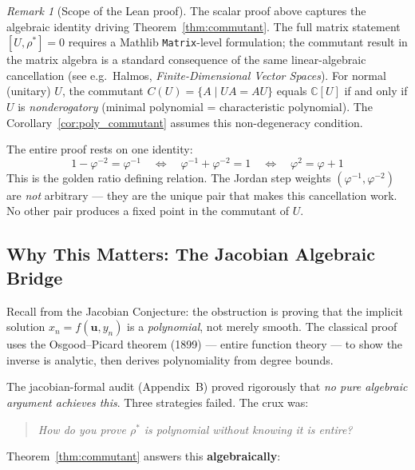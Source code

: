 \documentclass[12pt, letterpaper]{article}
\theoremstyle{plain}
\theoremstyle{definition}
\theoremstyle{remark}
\newtheorem{remark}[theorem]{Remark}
\begin{document}
\begin{remark}[Scope of the Lean proof]
The scalar proof above captures the algebraic identity driving Theorem~\ref{thm:commutant}.
The full matrix statement $[U, \rho^*] = 0$ requires a Mathlib \texttt{Matrix}-level
formulation; the commutant result in the matrix algebra is a standard consequence
of the same linear-algebraic cancellation (see e.g.\ Halmos, \textit{Finite-Dimensional Vector Spaces}).
For normal (unitary) $U$, the commutant $C(U) = \{A \mid UA = AU\}$ equals $\mathbb{C}[U]$
if and only if $U$ is \textit{nonderogatory} (minimal polynomial = characteristic polynomial).
The Corollary~\ref{cor:poly_commutant} assumes this non-degeneracy condition.
\end{remark}

\begin{noveltybox}[title={The Key Identity: $1 - \varphi^{-2} = \varphi^{-1}$}]
The entire proof rests on one identity:
\[
  1 - \varphi^{-2} = \varphi^{-1}
  \quad\Longleftrightarrow\quad
  \varphi^{-1} + \varphi^{-2} = 1
  \quad\Longleftrightarrow\quad
  \varphi^2 = \varphi + 1
\]
This is the golden ratio defining relation. The Jordan step weights
$(\varphi^{-1}, \varphi^{-2})$ are \textit{not} arbitrary --- they are the unique
pair that makes this cancellation work. No other pair produces a fixed point in the
commutant of $U$.
\end{noveltybox}

\subsection{Why This Matters: The Jacobian Algebraic Bridge}

Recall from the Jacobian Conjecture: the obstruction is proving that the implicit
solution $x_n = f(\mathbf{u}, y_n)$ is a \textit{polynomial}, not merely smooth.
The classical proof uses the Osgood--Picard theorem (1899) --- entire function theory ---
to show the inverse is analytic, then derives polynomiality from degree bounds.

The jacobian-formal audit (Appendix~B) proved rigorously that \textit{no pure algebraic
argument achieves this}. Three strategies failed. The crux was:

\begin{quote}
\textit{How do you prove $\rho^*$ is polynomial without knowing it is entire?}
\end{quote}

Theorem~\ref{thm:commutant} answers this \textbf{algebraically}:
\end{document}
